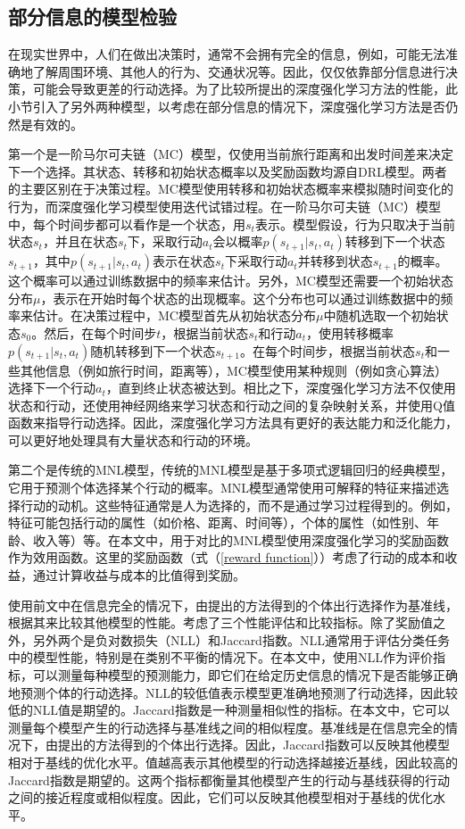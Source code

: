 \subsection{部分信息的模型检验}

在现实世界中，人们在做出决策时，通常不会拥有完全的信息，例如，可能无法准确地了解周围环境、其他人的行为、交通状况等。因此，仅仅依靠部分信息进行决策，可能会导致更差的行动选择。为了比较所提出的深度强化学习方法的性能，此小节引入了另外两种模型，以考虑在部分信息的情况下，深度强化学习方法是否仍然是有效的。

第一个是一阶马尔可夫链（MC）模型，仅使用当前旅行距离和出发时间差来决定下一个选择。其状态、转移和初始状态概率以及奖励函数均源自DRL模型。两者的主要区别在于决策过程。MC模型使用转移和初始状态概率来模拟随时间变化的行为，而深度强化学习模型使用迭代试错过程。在一阶马尔可夫链（MC）模型中，每个时间步都可以看作是一个状态，用$s_t$表示。模型假设，行为只取决于当前状态$s_t$，并且在状态$s_t$下，采取行动$a_t$会以概率$p(s_{t+1}|s_t, a_t)$转移到下一个状态$s_{t+1}$，其中$p(s_{t+1}|s_t, a_t)$表示在状态$s_t$下采取行动$a_t$并转移到状态$s_{t+1}$的概率。这个概率可以通过训练数据中的频率来估计。另外，MC模型还需要一个初始状态分布$\mu$，表示在开始时每个状态的出现概率。这个分布也可以通过训练数据中的频率来估计。在决策过程中，MC模型首先从初始状态分布$\mu$中随机选取一个初始状态$s_0$。然后，在每个时间步$t$，根据当前状态$s_t$和行动$a_t$，使用转移概率$p(s_{t+1}|s_t, a_t)$随机转移到下一个状态$s_{t+1}$。在每个时间步，根据当前状态$s_t$和一些其他信息（例如旅行时间，距离等），MC模型使用某种规则（例如贪心算法）选择下一个行动$a_t$，直到终止状态被达到。相比之下，深度强化学习方法不仅使用状态和行动，还使用神经网络来学习状态和行动之间的复杂映射关系，并使用Q值函数来指导行动选择。因此，深度强化学习方法具有更好的表达能力和泛化能力，可以更好地处理具有大量状态和行动的环境。

第二个是传统的MNL模型，传统的MNL模型是基于多项式逻辑回归的经典模型，它用于预测个体选择某个行动的概率。MNL模型通常使用可解释的特征来描述选择行动的动机。这些特征通常是人为选择的，而不是通过学习过程得到的。例如，特征可能包括行动的属性（如价格、距离、时间等），个体的属性（如性别、年龄、收入等）等。在本文中，用于对比的MNL模型使用深度强化学习的奖励函数作为效用函数。这里的奖励函数（式（\ref{reward function}））考虑了行动的成本和收益，通过计算收益与成本的比值得到奖励。

使用前文中在信息完全的情况下，由提出的方法得到的个体出行选择作为基准线，根据其来比较其他模型的性能。考虑了三个性能评估和比较指标。除了奖励值之外，另外两个是负对数损失（NLL）和Jaccard指数。NLL通常用于评估分类任务中的模型性能，特别是在类别不平衡的情况下。在本文中，使用NLL作为评价指标，可以测量每种模型的预测能力，即它们在给定历史信息的情况下是否能够正确地预测个体的行动选择。NLL的较低值表示模型更准确地预测了行动选择，因此较低的NLL值是期望的。Jaccard指数是一种测量相似性的指标。在本文中，它可以测量每个模型产生的行动选择与基准线之间的相似程度。基准线是在信息完全的情况下，由提出的方法得到的个体出行选择。因此，Jaccard指数可以反映其他模型相对于基线的优化水平。值越高表示其他模型的行动选择越接近基线，因此较高的Jaccard指数是期望的。这两个指标都衡量其他模型产生的行动与基线获得的行动之间的接近程度或相似程度。因此，它们可以反映其他模型相对于基线的优化水平。

